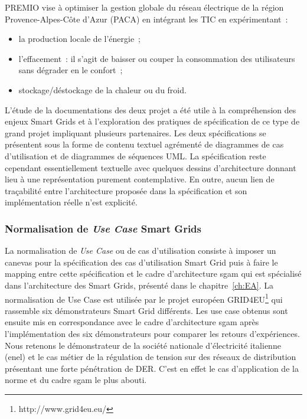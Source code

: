 PREMIO vise à optimiser la gestion globale du réseau électrique de la région 
Provence-Alpes-Côte d'Azur (PACA) en intégrant les TIC en expérimentant~:
\begin{itemize}
\item la production locale de l'énergie~;
\item l'effacement~: il s'agit de baisser ou couper la consommation des 
utilisateurs sans dégrader en le confort~;
\item stockage/déstockage de la chaleur ou du froid.
\end{itemize}

L'étude de la documentations des deux projet a été utile à la compréhension des 
enjeux Smart Grids et à l'exploration des pratiques de spécification de ce type 
de grand projet impliquant plusieurs partenaires. Les deux spécifications se 
présentent sous la forme de contenu textuel agrémenté de diagrammes de cas 
d'utilisation et de diagrammes de séquences UML. La spécification reste 
cependant essentiellement textuelle avec quelques dessins d'architecture donnant 
lieu à une représentation purement contemplative. En outre, aucun lien de 
traçabilité entre l'architecture proposée dans la spécification et son 
implémentation réelle n'est explicité.
 
\subsubsection{Normalisation de \textit{Use Case} Smart Grids}
\label{sec:ENEL}

La normalisation de \textit{Use Case} ou de cas d'utilisation consiste 
à imposer un canevas pour la spécification des cas d'utilisation Smart Grid puis 
à faire le mapping entre cette spécification et le cadre d'architecture \gls{sgam} qui 
est spécialisé dans l'architecture des Smart Grids, présenté dans le 
chapitre~\ref{ch:EA}.
La normalisation de Use Case est utilisée par le projet européen GRID4EU\footnote{http://www.grid4eu.eu/} qui rassemble six démonstrateurs Smart Grid différents. Les use case obtenus sont ensuite mis en correspondance avec le cadre d'architecture \gls{sgam} après l'implémentation des six démonstrateurs pour comparer les 
retours d'expériences. Nous retenons le démonstrateur de la société nationale d'électricité italienne (\gls{enel}) et le cas métier de la régulation de tension sur des réseaux de distribution présentant une forte pénétration de DER. C'est en effet le cas d'application de la norme et du cadre \gls{sgam} le plus abouti. 

